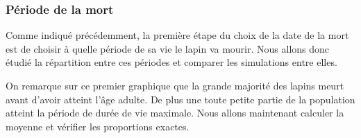 \documentclass[11)pt,a4paper]{article}
\begin{document}
        \subsubsection{Période de la mort}
            Comme indiqué précédemment, la première étape du choix de la date de la mort est de choisir à quelle période de sa vie le lapin va mourir.
            Nous allons donc étudié la répartition entre ces périodes et comparer les simulations entre elles. 
            \par
            \begin{center}
                \vspace{0.5cm}
            \end{center}
            On remarque sur ce premier graphique que la grande majorité des lapins meurt avant d'avoir atteint l'âge adulte.
            De plus une toute petite partie de la population atteint la période de durée de vie maximale. Nous allons maintenant calculer la moyenne et vérifier les proportions exactes.
\end{document}
